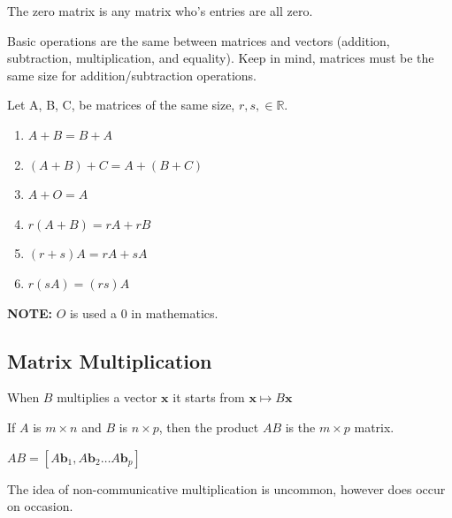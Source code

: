 \documentclass{report}
\begin{document}
\begin{definition}
The zero matrix is any matrix who's entries are all zero.
\end{definition}

Basic operations are the same between matrices and vectors (addition, subtraction, multiplication, and equality). Keep in mind, matrices must be the same size for addition/subtraction operations.

\begin{theorem}
Let A, B, C, be matrices of the same size, $r,s,\in \mathbb{R}$.
\begin{enumerate}
	\item $A+B = B+A$
	\item $(A + B) + C = A + (B + C)$
	\item $A + O = A$
	\item $r(A +B) = rA +rB$
	\item $(r +s)A = rA +sA$
	\item $r(sA) = (rs)A$
\end{enumerate}
\textbf{NOTE:} $O$ is used a 0 in mathematics.
\end{theorem}

\subsection*{Matrix Multiplication}
When $B$ multiplies a vector $\mathbf{x}$ it starts from $\mathbf{x}\mapsto B\mathbf{x}$

\begin{definition}
If $A$ is $m \times n$ and $B$ is $n \times p$, then the product $AB$ is the $m \times p$ matrix.
\begin{center}
$AB = [A\mathbf{b}_1, A\mathbf{b}_2 \dots A\mathbf{b}_p]$
\end{center}
\end{definition}

\begin{remark}
The idea of non-communicative multiplication is uncommon, however does occur on occasion.
\end{remark}
\end{document}
